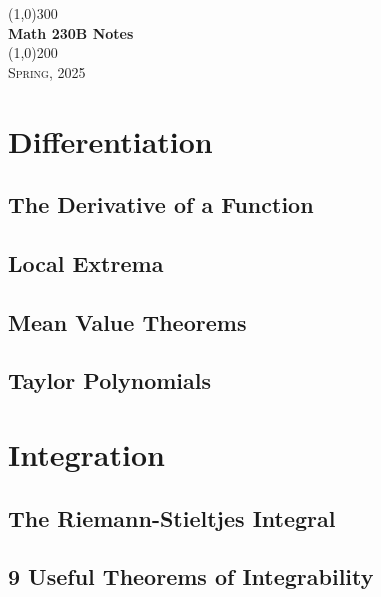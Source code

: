 \documentclass[a4paper, openany]{book}
\begin{document}
\begin{titlepage}
    \begin{center}
        \line(1,0){300} \\
        [0.25in]
        \huge{\bfseries Math 230B Notes} \\
        [2mm]
        \line(1,0){200} \\
        [1.5cm]
        \textsc{\LARGE Spring, 2025}
    \end{center}
\end{titlepage}

\tableofcontents
\setcounter{section}{0}

\chapter{Differentiation}

\section{The Derivative of a Function}

\newpage

\section{Local Extrema}

\newpage

\section{Mean Value Theorems}

\newpage

\section{Taylor Polynomials}

\newpage

\chapter{Integration}

\section{The Riemann-Stieltjes Integral}

\newpage

\section{9 Useful Theorems of Integrability}

\newpage
\end{document}
